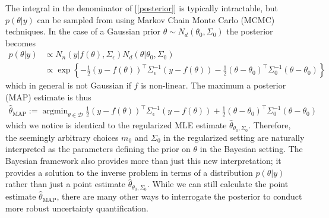 \documentclass[12pt]{article}
\DeclareMathOperator*{\argmin}{argmin}
\begin{document}
The integral in the denominator of [\ref{posterior}] is typically intractable, but $p(\theta|y)$ can be sampled from using Markov Chain Monte Carlo (MCMC) techniques. In the case of a Gaussian prior 
$\theta \sim N_d(\theta_0, \Sigma_0)$ the posterior becomes
\begin{align}
p(\theta|y) &\propto N_n(y|f(\theta), \Sigma_\epsilon)N_d(\theta|\theta_0, \Sigma_0) \\
 		&\propto \exp\left\{-\frac{1}{2} (y - f(\theta))^{\top} \Sigma_\epsilon^{-1} (y - f(\theta)) - \frac{1}{2} (\theta - \theta_0)^{\top} \Sigma_0^{-1}(\theta - \theta_0) \right\} \nonumber
\end{align}
which in general is not Gaussian if $f$ is non-linear. The maximum a posterior (MAP) estimate is thus
\begin{align}
\hat{\theta}_{\text{MAP}} := \argmin_{\theta \in \mathcal{D}} \frac{1}{2} (y - f(\theta))^{\top} \Sigma_\epsilon^{-1} (y - f(\theta)) + \frac{1}{2} (\theta - \theta_0)^{\top} \Sigma_0^{-1}(\theta - \theta_0) \label{MAP}
\end{align}
which we notice is identical to the regularized MLE estimate $\hat{\theta}_{\theta_0, \Sigma_0}$. Therefore, the seemingly arbitrary choices $m_0$ and $\Sigma_0$ in the regularized setting are naturally 
interpreted as the parameters defining the prior on $\theta$ in the Bayesian setting. The Bayesian framework also provides more than just this new interpretation; it provides a solution to the inverse problem 
in terms of a distribution $p(\theta|y)$ rather than just a point estimate $\hat{\theta}_{\theta_0, \Sigma_0}$. While we can still calculate the point estimate $\hat{\theta}_{\text{MAP}}$, there are many other ways 
to interrogate the posterior to conduct more robust uncertainty quantification. 
\end{document}
